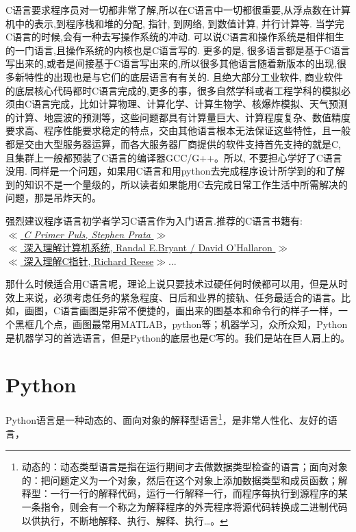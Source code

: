 \documentclass[utf8]{book}
\begin{document}
	C语言要求程序员对一切都非常了解,所以在C语言中一切都很重要,从浮点数在计算机中的表示,到程序栈和堆的分配, 指针, 到网络, 到数值计算, 并行计算等. 当学完C语言的时候,会有一种去写操作系统的冲动. 可以说C语言和操作系统是相伴相生的一门语言,且操作系统的内核也是C语言写的. 更多的是, 很多语言都是基于C语言写出来的,或者是间接基于C语言写出来的,所以很多其他语言随着新版本的出现,很多新特性的出现也是与它们的底层语言有有关的. 且绝大部分工业软件, 商业软件的底层核心代码都时C语言完成的,更多的事，很多自然学科或者工程学科的模拟必须由C语言完成，比如计算物理、计算化学、计算生物学、核爆炸模拟、天气预测的计算、地震波的预测等，这些问题都具有计算量巨大、计算程度复杂、数值精度要求高、程序性能要求稳定的特点，交由其他语言根本无法保证这些特性，且一般都是交由大型服务器运算，而各大服务器厂商提供的软件支持首先支持的就是C, 且集群上一般都预装了C语言的编译器GCC/G++。所以, 不要担心学好了C语言没用. 同样是一个问题，如果用C语言和用python去完成程序设计所学到的和了解到的知识不是一个量级的，所以读者如果能用C去完成日常工作生活中所需解决的问题，那是吊炸天的。

	强烈建议程序语言初学者学习C语言作为入门语言.推荐的C语言书籍有:\\
	\href{https://book.douban.com/subject/26792521/}{$\ll$\textit{ C  Primer  Puls, Stephen Prata} $\gg $}\\ \href{https://book.douban.com/subject/26912767/}{$\ll$ 深入理解计算机系统,  Randal E.Bryant / David O'Hallaron $\gg$}\\
	\href{https://book.douban.com/subject/25827246/}{$\ll$ 深入理解C指针, Richard Reese$\gg$}...  
	
	那什么时候适合用C语言呢，理论上说只要技术过硬任何时候都可以用，但是从时效上来说，必须考虑任务的紧急程度、日后和业界的接轨、任务最适合的语言。比如，画图，C语言画图是非常不便捷的，画出来的图基本和命令行的样子一样，一个黑框几个点，画图最常用MATLAB，python等；机器学习，众所众知，Python是机器学习的首选语言，但是Python的底层也是C写的。我们是站在巨人肩上的。


\section{Python}

	Python语言是一种动态的、面向对象的解释型语言\footnote{动态的：动态类型语言是指在运行期间才去做数据类型检查的语言；面向对象的：把问题定义为一个对象，然后在这个对象上添加数据类型和成员函数；解释型：一行一行的解释代码，运行一行解释一行，而程序每执行到源程序的某一条指令，则会有一个称之为解释程序的外壳程序将源代码转换成二进制代码以供执行，不断地解释、执行、解释、执行…。}，是非常人性化、友好的语言，
\end{document}
